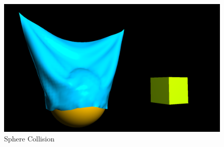 \documentclass[acmtog]{acmart}
\begin{document}
\begin{figure}[h]
	\centering
	\includegraphics[width=0.7\linewidth]{Sphere Collision.png}
	\caption{Sphere Collision}
	\label{fig:collision}
\end{figure}
\end{document}
